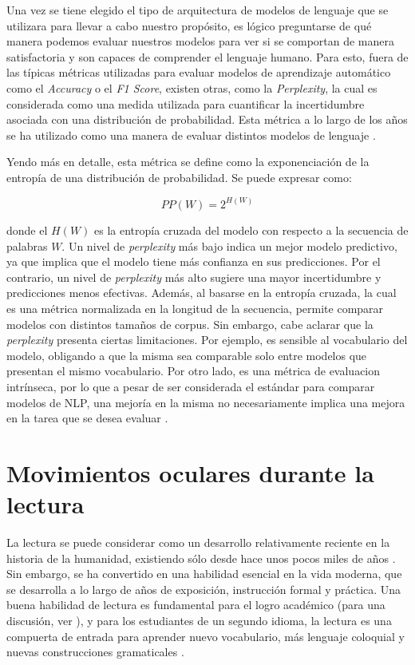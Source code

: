 Una vez se tiene elegido el tipo de arquitectura de modelos de lenguaje que se utilizara para llevar a cabo nuestro propósito, es lógico preguntarse de qué manera podemos evaluar nuestros modelos para ver si se comportan de manera satisfactoria y son capaces de comprender el lenguaje humano. Para esto, fuera de las típicas métricas utilizadas para evaluar modelos de aprendizaje automático como el \textit{Accuracy} o el \textit{F1 Score}, existen otras, como la \textit{Perplexity}, la cual es considerada como una medida utilizada para cuantificar la incertidumbre asociada con una distribución de probabilidad. Esta métrica a lo largo de los años se ha utilizado como una manera de evaluar distintos modelos de lenguaje \parencite{merity2017regularizingoptimizinglstmlanguage}.

Yendo más en detalle, esta métrica se define como la exponenciación de la entropía de una distribución de probabilidad. Se puede expresar como:

\[
PP(W) = 2^{H(W)}
\]

donde el $H(W)$ es la entropía cruzada del modelo con respecto a la secuencia de palabras $W$. Un nivel de \textit{perplexity} más bajo indica un mejor modelo predictivo, ya que implica que el modelo tiene más confianza en sus predicciones. Por el contrario, un nivel de \textit{perplexity} más alto sugiere una mayor incertidumbre y predicciones menos efectivas. Además, al basarse en la entropía cruzada, la cual es una métrica normalizada en la longitud de la secuencia, permite comparar modelos con distintos tamaños de corpus. Sin embargo, cabe aclarar que la \textit{perplexity} presenta ciertas limitaciones. Por ejemplo, es sensible al vocabulario del modelo, obligando a que la misma sea comparable solo entre modelos que presentan el mismo vocabulario. Por otro lado, es una métrica de evaluacion intrínseca, por lo que a pesar de ser considerada el estándar para comparar modelos de NLP, una mejoría en la misma no necesariamente implica una mejora en la tarea que se desea evaluar \parencite{jurafsky2000speech}.

\section{Movimientos oculares durante la lectura}

La lectura se puede considerar como un desarrollo relativamente reciente en la historia de la humanidad, existiendo sólo desde hace unos pocos miles de años \parencite{ImmordinoYangDeacon2007}. Sin embargo, se ha convertido en una habilidad esencial en la vida moderna, que se desarrolla a lo largo de años de exposición, instrucción formal y práctica.
Una buena habilidad de lectura es fundamental para el logro académico (para una discusión, ver \textcite{Renadya}), y para los estudiantes de un segundo idioma, la lectura es una compuerta de entrada para aprender nuevo vocabulario, más lenguaje coloquial y nuevas construcciones gramaticales \parencite{wilkinson}.

